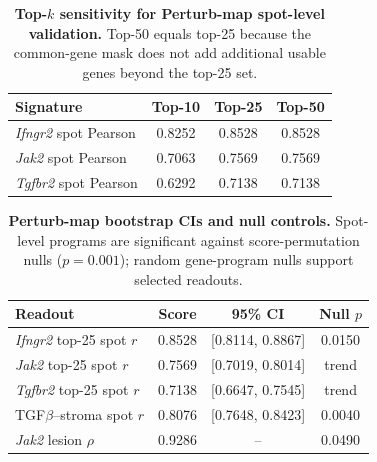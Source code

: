 \documentclass[sigconf,review,balance=false]{acmart}
\begin{document}
\begin{table}[t]
\centering
\small
\setlength{\tabcolsep}{5pt}
\renewcommand{\arraystretch}{1.08}
\caption{\textbf{Top-$k$ sensitivity for Perturb-map spot-level validation.}
Top-50 equals top-25 because the common-gene mask does not add additional usable
genes beyond the top-25 set.}
\label{tab:perturbmap_topk}
\begin{tabular}{lccc}
\toprule
Signature & Top-10 & Top-25 & Top-50 \\
\midrule
\textit{Ifngr2} spot Pearson & 0.8252 & 0.8528 & 0.8528 \\
\textit{Jak2} spot Pearson & 0.7063 & 0.7569 & 0.7569 \\
\textit{Tgfbr2} spot Pearson & 0.6292 & 0.7138 & 0.7138 \\
\bottomrule
\end{tabular}
\end{table}



\begin{table}[t]
\centering
\small
\setlength{\tabcolsep}{2.2pt}
\renewcommand{\arraystretch}{1.06}
\caption{\textbf{Perturb-map bootstrap CIs and null controls.}
Spot-level programs are significant against score-permutation nulls
($p=0.001$); random gene-program nulls support selected readouts.}
\label{tab:perturbmap_null_ci}
\begin{tabularx}{\columnwidth}{@{}
>{\raggedright\arraybackslash}X
ccc@{}}
\toprule
Readout & Score & 95\% CI & \shortstack{Null\\$p$} \\
\midrule
\textit{Ifngr2} top-25 spot $r$      & 0.8528 & [0.8114, 0.8867] & 0.0150 \\
\textit{Jak2} top-25 spot $r$        & 0.7569 & [0.7019, 0.8014] & trend \\
\textit{Tgfbr2} top-25 spot $r$      & 0.7138 & [0.6647, 0.7545] & trend \\
TGF$\beta$--stroma spot $r$          & 0.8076 & [0.7648, 0.8423] & 0.0040 \\
\textit{Jak2} lesion $\rho$          & 0.9286 & --               & 0.0490 \\
\bottomrule
\end{tabularx}
\end{table}
\end{document}
